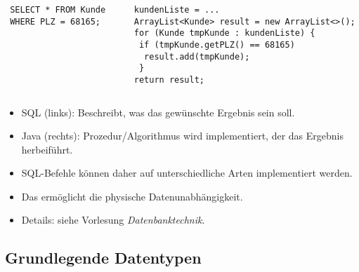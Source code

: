 \begin{frame}[fragile]\frametitle{\insertsection}
\framesubtitle{\insertsubsection}
\onslide
\begin{columns}
	\begin{column}{.2\textwidth}
\lstset{language=SQL}
\begin{lstlisting}
 SELECT * FROM Kunde 
 WHERE PLZ = 68165;
\end{lstlisting}
	\end{column}
	\begin{column}{.48\textwidth}
		\lstset{language=Java}
\begin{lstlisting}
 kundenListe = ...
 ArrayList<Kunde> result = new ArrayList<>();
 for (Kunde tmpKunde : kundenListe) {
  if (tmpKunde.getPLZ() == 68165)
   result.add(tmpKunde);
  }
 return result;
\end{lstlisting}
	\end{column}
\end{columns}
\begin{itemize}
\item SQL (links): Beschreibt, was das gew\"unschte Ergebnis sein soll. 
\item Java (rechts): Prozedur/Algorithmus wird implementiert, der das Ergebnis herbeif\"uhrt.\\[8pt]
\pause
\item SQL-Befehle k\"onnen daher auf unterschiedliche Arten implementiert werden.
\item Das erm\"oglicht die physische Datenunabh\"angigkeit.
\item Details: siehe Vorlesung \textit{Datenbanktechnik}.
\end{itemize}
\end{frame}

\subsection{Grundlegende Datentypen}

